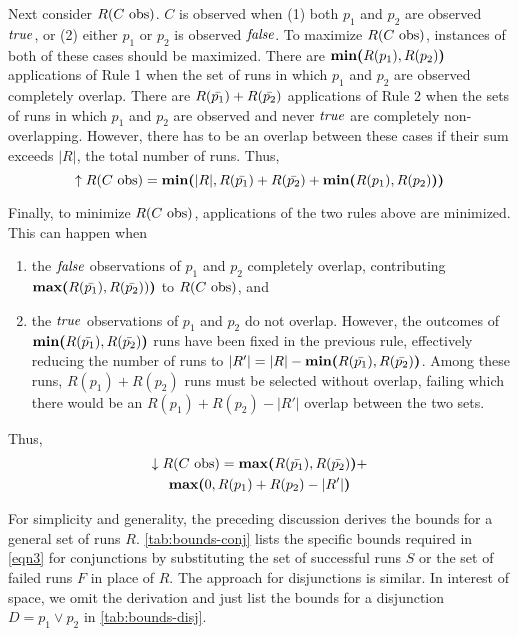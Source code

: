 Next consider $R(\text{$C$ obs})$.  $C$ is observed when (1) both $p_1$ and
$p_2$ are observed $\mathit{true}$, or (2) either $p_1$ or $p_2$ is observed
$\mathit{false}$.
To maximize $R(\text{$C$ obs})$, instances of both of these cases should be
maximized.
There are $\textbf{min(}R(p_1), R(p_2)\textbf{)}$ applications of Rule 1 when the set
of runs in which $p_1$ and $p_2$ are observed completely overlap.
There are $R(\text{$\bar{p_1}$}) + R(\text{$\bar{p_2}$})$ applications of Rule
2 when the sets of runs in which $p_1$ and $p_2$ are observed and never $\mathit{true}$ are
completely non-overlapping.
However, there has to be an overlap between these cases if their sum exceeds
$|R|$, the total number of runs.  Thus,
\begin{equation*}
  \uparrow R(\text{$C$ obs}) = \textbf{min(}|R|, R(\text{$\bar{p_1}$}) + R(\text{$\bar{p_2}$})
                   + \textbf{min(}R(p_1), R(p_2)\textbf{)}\textbf{)}
\end{equation*}

Finally, to minimize $R(\text{$C$ obs})$, applications of the two rules above are
minimized.  This can happen when
\begin{enumerate}
\item the $\mathit{false}$ observations of $p_1$ and $p_2$ completely overlap, contributing
$\textbf{max(}R(\text{$\bar{p_1}$}), R(\text{$\bar{p_2}$}))\textbf{)}$ to $R(\text{$C$ obs})$, and
\item the $\mathit{true}$ observations of $p_1$ and $p_2$ do not overlap.
However, the outcomes of $\textbf{min(}R(\text{$\bar{p_1}$}), R(\text{$\bar{p_2}$})\textbf{)}$ runs have
been fixed in the previous rule, effectively reducing the number of runs to
$|R'| = |R| - \textbf{min(}R(\text{$\bar{p_1}$}), R(\text{$\bar{p_2}$})\textbf{)}$.  Among these runs,
$R(p_1) + R(p_2)$
runs must be selected without overlap, failing which there would be an
$R(p_1) + R(p_2) - |R'|$ overlap
between the two sets.
\end{enumerate}

Thus,
\begin{multline}
  \downarrow R(\text{$C$ obs}) = \textbf{max(}R(\text{$\bar{p_1}$}), R(\text{$\bar{p_2}$})\textbf{)} + \\
  \textbf{max(}0, R(p_1) + R(p_2) - |R'|\textbf{)}
\end{multline}

For simplicity and generality, the preceding discussion derives the
bounds for a general set of runs $R$.  \autoref{tab:bounds-conj} lists
the specific bounds required in \autoref{eqn3} for conjunctions by
substituting the set of successful runs $S$ or the set of failed runs
$F$ in place of $R$.  The approach for disjunctions is similar.  In
interest of space, we omit the derivation and just list the bounds for
a disjunction $D = p_1 \vee p_2$ in \autoref{tab:bounds-disj}.

